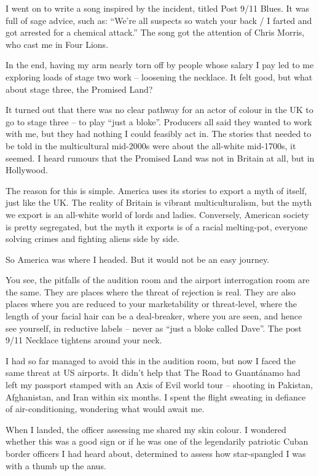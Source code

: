 \documentclass[10pt,a4paper]{article}
\begin{document}
I went on to write a song inspired by the incident, titled Post 9/11 Blues. It was full of sage advice, such as: “We’re all suspects so watch your back / I farted and got arrested for a chemical attack.” The song got the attention of Chris Morris, who cast me in Four Lions.

In the end, having my arm nearly torn off by people whose salary I pay led to me exploring loads of stage two work – loosening the necklace. It felt good, but what about stage three, the Promised Land?

It turned out that there was no clear pathway for an actor of colour in the UK to go to stage three – to play “just a bloke”. Producers all said they wanted to work with me, but they had nothing I could feasibly act in. The stories that needed to be told in the multicultural mid-2000s were about the all-white mid-1700s, it seemed. I heard rumours that the Promised Land was not in Britain at all, but in Hollywood.

The reason for this is simple. America uses its stories to export a myth of itself, just like the UK. The reality of Britain is vibrant multiculturalism, but the myth we export is an all-white world of lords and ladies. Conversely, American society is pretty segregated, but the myth it exports is of a racial melting-pot, everyone solving crimes and fighting aliens side by side.

So America was where I headed. But it would not be an easy journey.

You see, the pitfalls of the audition room and the airport interrogation room are the same. They are places where the threat of rejection is real. They are also places where you are reduced to your marketability or threat-level, where the length of your facial hair can be a deal-breaker, where you are seen, and hence see yourself, in reductive labels – never as “just a bloke called Dave”. The post 9/11 Necklace tightens around your neck.

I had so far managed to avoid this in the audition room, but now I faced the same threat at US airports. It didn’t help that The Road to Guantánamo had left my passport stamped with an Axis of Evil world tour – shooting in Pakistan, Afghanistan, and Iran within six months. I spent the flight sweating in defiance of air-conditioning, wondering what would await me.

When I landed, the officer assessing me shared my skin colour. I wondered whether this was a good sign or if he was one of the legendarily patriotic Cuban border officers I had heard about, determined to assess how star-spangled I was with a thumb up the anus.
\end{document}
